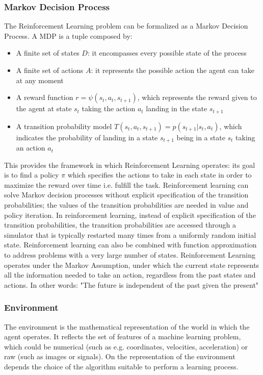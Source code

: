 \subsubsection{Markov Decision Process}
The Reinforcement Learning problem can be formalized as a Markov Decision Process. A MDP is a tuple composed by:
\begin{itemize}
  \item A finite set of states \(D\): it encompasses every possible state of the process
  \item A finite set of actions \(A\): it represents the possible action the agent can take at any moment
  	\item A reward function \(r = \psi(s_t,a_t,s_{t+1})\), which represents the reward given to the agent at state \(s_t\) taking the action \(a_t\) landing in the state \(s_{t+1}\)
  	\item A transition probability model \(T(s_t,a_t,s_{t+1}) = p(s_{t+1}|s_t,a_t)\), which indicates the probability of landing in a state \(s_{t+1}\) being in a state \(s_t\) taking an action \(a_t\)
\end{itemize}

This provides the framework in which Reinforcement Learning operates: its goal is to find a policy \(\pi\) which specifies the actions to take in each state in order to maximize the reward over time i.e. fulfill the task.
Reinforcement learning can solve Markov decision processes without explicit specification of the transition probabilities; the values of the transition probabilities are needed in value and policy iteration. In reinforcement learning, instead of explicit specification of the transition probabilities, the transition probabilities are accessed through a simulator that is typically restarted many times from a uniformly random initial state. Reinforcement learning can also be combined with function approximation to address problems with a very large number of states.
Reinforcement Learning operates under the Markov Assumption, under which the current state represents all the information needed to take an action, regardless from the past states and actions.
In other words: "The future is independent of the past given the present"

\subsubsection{Environment}
The environment is the mathematical representation of the world in which the agent operates. It reflects the set of features of a machine learning problem, which could be numerical (such as e.g. coordinates, velocities, acceleration) or raw (such as images or signals). On the representation of the environment depends the choice of the algorithm suitable to perform a learning process.

